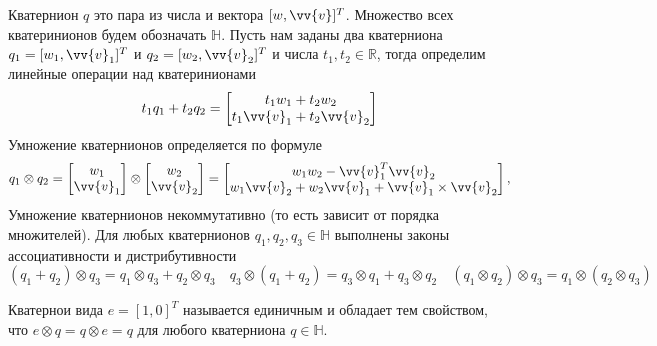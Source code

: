 \documentclass[12pt]{article}
\begin{document}
Кватернион $q$ это пара из числа и вектора $[w, \vv{v}]^T$. Множество всех
кватеринионов будем обозначать $\mathbb{H}$. Пусть нам заданы два
кватерниона $q_1=[w_1,\vv{v}_1]^T$ и $q_2=[w_2,\vv{v}_2]^T$ и
числа $t_1,t_2\in\mathbb{R}$, тогда определим линейные операции над
кватеринионами
\begin{equation}
    t_1 q_1+ t_2 q_2=\begin{bmatrix}
        t_1 w_1 + t_2 w_2 \\ t_1 \vv{v}_1 + t_2 \vv{v}_2
    \end{bmatrix}
\end{equation}
Умножение кватернионов определяется по формуле
\begin{equation}
    q_1\otimes q_2
    =\begin{bmatrix} w_1 \\ \vv{v}_1\end{bmatrix}
    \otimes
    \begin{bmatrix} w_2 \\ \vv{v}_2\end{bmatrix}
    =\begin{bmatrix}
        w_1 w_2 - \vv{v}_1^T\vv{v}_2 \\
        w_1 \vv{v}_2 + w_2 \vv{v}_1 + \vv{v}_1\times \vv{v}_2
    \end{bmatrix},
\end{equation}
Умножение кватернионов некоммутативно (то есть зависит от порядка множителей).
Для любых кватернионов $q_1, q_2, q_3\in\mathbb{H}$ выполнены законы
ассоциативности и дистрибутивности
\begin{equation}
    (q_1+q_2)\otimes q_3=q_1\otimes q_3 + q_2\otimes q_3
    \quad
    q_3\otimes (q_1+q_2)=q_3\otimes q_1 + q_3\otimes q_2
    \quad
    (q_1\otimes q_2)\otimes q_3=q_1\otimes(q_2\otimes q_3)
\end{equation}

Кватернои вида $e=[1, 0]^T$ называется единичным и обладает тем свойством, что
$e \otimes q=q \otimes e=q$ для любого кватерниона $q\in\mathbb{H}$.
\end{document}
